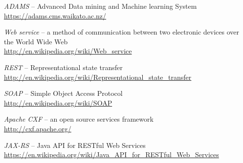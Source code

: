 
\begin{thebibliography}{999}

		\textit{ADAMS} -- Advanced Data mining and Machine learning System \\
		{\scriptsize \url{https://adams.cms.waikato.ac.nz/}{}}
		
		\textit{Web service} -- a method of communication between two electronic 
		devices over the World Wide Web \\
		{\scriptsize \url{http://en.wikipedia.org/wiki/Web_service}{}}
		
		\textit{REST} -- Representational state transfer \\
		{\scriptsize \url{http://en.wikipedia.org/wiki/Representational_state_transfer}{}}

		\textit{SOAP} -- Simple Object Access Protocol \\
		\url{http://en.wikipedia.org/wiki/SOAP}{}

		\textit{Apache CXF} -- an open source services framework \\
		{\scriptsize \url{http://cxf.apache.org/}{}}
		
		\textit{JAX-RS} -- Java API for RESTful Web Services \\
		{\scriptsize \url{https://en.wikipedia.org/wiki/Java_API_for_RESTful_Web_Services}{}}

\end{thebibliography}
